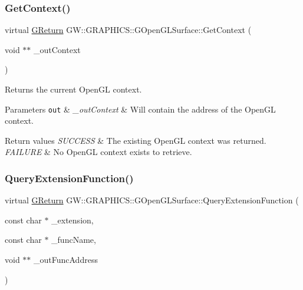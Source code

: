 \subsubsection{\texorpdfstring{Get\+Context()}{GetContext()}}
{\footnotesize\ttfamily virtual \hyperlink{namespaceGW_a67a839e3df7ea8a5c5686613a7a3de21}{G\+Return} G\+W\+::\+G\+R\+A\+P\+H\+I\+C\+S\+::\+G\+Open\+G\+L\+Surface\+::\+Get\+Context (\begin{DoxyParamCaption}\item[{void $\ast$$\ast$}]{\+\_\+out\+Context }\end{DoxyParamCaption})\hspace{0.3cm}{\ttfamily [pure virtual]}}



Returns the current Open\+GL context. 


\begin{DoxyParams}[1]{Parameters}
\mbox{\tt out}  & {\em \+\_\+out\+Context} & Will contain the address of the Open\+GL context.\\
\hline
\end{DoxyParams}

\begin{DoxyRetVals}{Return values}
{\em S\+U\+C\+C\+E\+SS} & The existing Open\+GL context was returned. \\
\hline
{\em F\+A\+I\+L\+U\+RE} & No Open\+GL context exists to retrieve. \\
\hline
\end{DoxyRetVals}
\mbox{\label{classGW_1_1GRAPHICS_1_1GOpenGLSurface_a045548083dbdd547b18ef9b9a896f0de}} 
\subsubsection{\texorpdfstring{Query\+Extension\+Function()}{QueryExtensionFunction()}}
{\footnotesize\ttfamily virtual \hyperlink{namespaceGW_a67a839e3df7ea8a5c5686613a7a3de21}{G\+Return} G\+W\+::\+G\+R\+A\+P\+H\+I\+C\+S\+::\+G\+Open\+G\+L\+Surface\+::\+Query\+Extension\+Function (\begin{DoxyParamCaption}\item[{const char $\ast$}]{\+\_\+extension,  }\item[{const char $\ast$}]{\+\_\+func\+Name,  }\item[{void $\ast$$\ast$}]{\+\_\+out\+Func\+Address }\end{DoxyParamCaption})\hspace{0.3cm}{\ttfamily [pure virtual]}}



